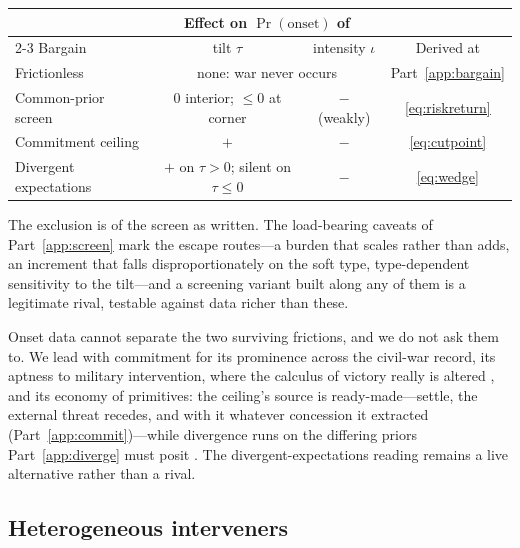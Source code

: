\medskip
\begin{center}
  \small
  \begin{tabular}{@{}lccc@{}}
    \toprule
    & \multicolumn{2}{c}{Effect on $\Pr(\text{onset})$ of} & \\
    \cmidrule(lr){2-3}
    Bargain & tilt $\tau$ & intensity $\iota$ & Derived at \\
    \midrule
    Frictionless & \multicolumn{2}{c}{none: war never occurs} & Part~\ref{app:bargain} \\
    Common-prior screen & $0$ interior; $\le 0$ at corner & $-$ (weakly) & \eqref{eq:riskreturn} \\
    Commitment ceiling & $+$ & $-$ & \eqref{eq:cutpoint} \\
    Divergent expectations & $+$ on $\tau > 0$; silent on $\tau \le 0$ & $-$ & \eqref{eq:wedge} \\
    \bottomrule
  \end{tabular}
\end{center}
\medskip

The exclusion is of the screen as written.  The load-bearing caveats of
Part~\ref{app:screen} mark the escape routes---a burden that scales rather
than adds, an increment that falls disproportionately on the soft type,
type-dependent sensitivity to the tilt---and a screening variant built along
any of them is a legitimate rival, testable against data richer than these.

Onset data cannot separate the two surviving frictions, and we do not ask
them to.  We lead with commitment for its prominence across the civil-war
record, its aptness to military intervention, where the calculus of
victory really is altered \citep{walter2009}, and its economy of
primitives: the ceiling's source is ready-made---settle, the external threat
recedes, and with it whatever concession it extracted
(Part~\ref{app:commit})---while divergence runs on the differing priors
Part~\ref{app:diverge} must posit \citep{aumann1976}.  The
divergent-expectations reading remains a live alternative rather than a
rival.

\subsection{Heterogeneous interveners}
\label{app:hetero}

